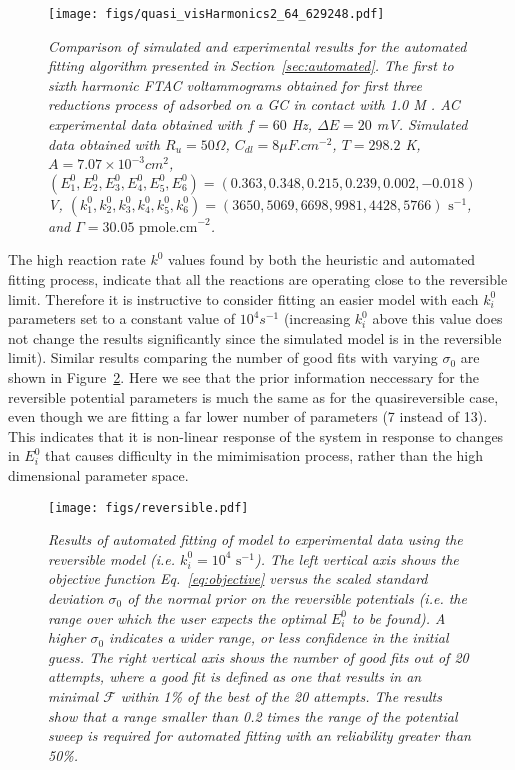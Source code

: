 \documentclass[a4paper, 12pt]{article}
\begin{document}
\begin{figure}[htbp]
\texttt{[image: figs/quasi\_visHarmonics2\_64\_629248.pdf]}
    \caption{\it{Comparison of simulated and experimental results for the
    automated fitting algorithm presented in Section~\ref{sec:automated}. The
    first to sixth harmonic FTAC voltammograms obtained for first three
    reductions process of  adsorbed on a GC in contact with 1.0
    M . AC experimental data obtained with $f = 60$ Hz, $\Delta E =
    20$ mV. Simulated data obtained with $R_u = 50 \Omega$, $C_{dl} = 8 \mu
    F.cm^{-2}$, $T = 298.2$ K, $A = 7.07 \times 10^{-3} cm^2$,
    $(E^0_1,E^0_2,E^0_3,E^0_4,E^0_5,E^0_6) = (0.363, 0.348, 0.215, 0.239, 0.002,
    -0.018)$ V, $(k^0_1,k^0_2,k^0_3,k^0_4,k^0_5,k^0_6) = (3650, 5069, 6698, 9981,
    4428, 5766)\text{ s}^{-1}$, and $\Gamma = 30.05\text{ pmole.cm}^{-2}$.}}
    \label{fig:quasi_best_result}
\end{figure}

The high reaction rate $k^0$ values found by both the heuristic and automated
fitting process, indicate that all the reactions are operating close to the
reversible limit. Therefore it is instructive to consider fitting an easier
model with each $k^0_i$ parameters set to a constant value of $10^4 s^{-1}$
(increasing $k^0_i$ above this value does not change the results significantly
since the simulated model is in the reversible limit). Similar results comparing
the number of good fits with varying $\sigma_0$ are shown in
Figure~\ref{fig:rev_results}. Here we see that the prior information neccessary
for the reversible potential parameters is much the same as for the
quasireversible case, even though we are fitting a far lower number of
parameters (7 instead of 13). This indicates that it is non-linear response of
the system in response to changes in $E^0_i$ that causes difficulty in the
mimimisation process, rather than the high dimensional parameter space.

\begin{figure}[htbp]
\texttt{[image: figs/reversible.pdf]}
    \caption{\it{Results of automated fitting of model to experimental data
    using the reversible model (i.e. $k^0_i = 10^{4}\text{ s}^{-1}$). The left
    vertical axis shows the objective function Eq.~\ref{eq:objective} versus the
    scaled standard deviation $\sigma_0$ of the normal prior on the reversible
    potentials (i.e. the range over which the user expects the optimal $E^0_i$
    to be found). A higher $\sigma_0$ indicates a wider range, or less
    confidence in the initial guess. The right vertical axis shows the number of
    good fits out of 20 attempts, where a good fit is defined as one that
    results in an minimal $\mathcal{F}$ within 1\% of the best of the 20
    attempts. The results show that a range smaller than 0.2 times the range of
    the potential sweep is required for automated fitting with an reliability 
    greater than 50\%.}}
    \label{fig:rev_results}
\end{figure}
\end{document}
